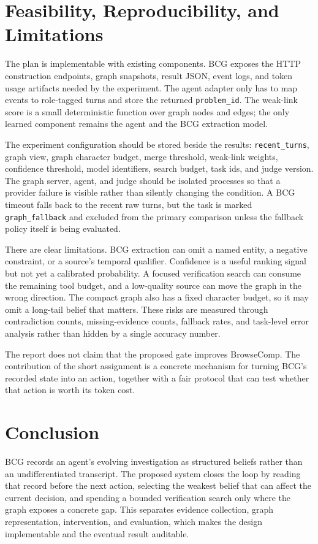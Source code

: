 \documentclass{article}
\begin{document}
\section{Feasibility, Reproducibility, and Limitations}\label{sec:discussion}

The plan is implementable with existing components. BCG exposes the HTTP
construction endpoints, graph snapshots, result JSON, event logs, and token
usage artifacts needed by the experiment. The agent adapter only has to map
events to role-tagged turns and store the returned \texttt{problem\_id}. The
weak-link score is a small deterministic function over graph nodes and edges;
the only learned component remains the agent and the BCG extraction model.

The experiment configuration should be stored beside the results:
\texttt{recent\_turns}, graph view, graph character budget, merge threshold,
weak-link weights, confidence threshold, model identifiers, search budget, task
ids, and judge version. The graph server, agent, and judge should be isolated
processes so that a provider failure is visible rather than silently changing
the condition. A BCG timeout falls back to the recent raw turns, but the task
is marked \texttt{graph\_fallback} and excluded from the primary comparison
unless the fallback policy itself is being evaluated.

There are clear limitations. BCG extraction can omit a named entity, a
negative constraint, or a source's temporal qualifier. Confidence is a useful
ranking signal but not yet a calibrated probability. A focused verification
search can consume the remaining tool budget, and a low-quality source can
move the graph in the wrong direction. The compact graph also has a fixed
character budget, so it may omit a long-tail belief that matters. These risks
are measured through contradiction counts, missing-evidence counts, fallback
rates, and task-level error analysis rather than hidden by a single accuracy
number.

The report does not claim that the proposed gate improves BrowseComp. The
contribution of the short assignment is a concrete mechanism for turning BCG's
recorded state into an action, together with a fair protocol that can test
whether that action is worth its token cost.

\section{Conclusion}\label{sec:conclusion}

BCG records an agent's evolving investigation as structured beliefs rather
than an undifferentiated transcript. The proposed system closes the loop by
reading that record before the next action, selecting the weakest belief that
can affect the current decision, and spending a bounded verification search
only where the graph exposes a concrete gap. This separates evidence
collection, graph representation, intervention, and evaluation, which makes
the design implementable and the eventual result auditable.

\begingroup
\small
\setlength{\bibsep}{2pt}


\endgroup
\end{document}

